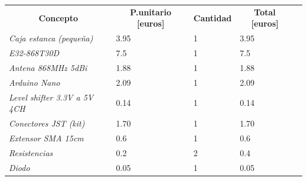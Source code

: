 \documentclass[12pt]{article}
\begin{document}
	\begin{table}[h!]
		\centering
		\begin{tabular}{l|l|l|l|l}
			\cline{1-4}
			\multicolumn{1}{|c|}{\textbf{Concepto}}                          & \multicolumn{1}{c|}{\textbf{P.unitario {[}euros{]}}} & \multicolumn{1}{c|}{\textbf{Cantidad}} & \multicolumn{1}{c|}{\textbf{Total {[}euros{]}}} &  \\ \cline{1-4}
			\multicolumn{1}{|l|}{\textit{Caja estanca (pequeña)}} & 3.95                                                 & 1                                      & 3.95                                            &  \\ \cline{1-4}
			\multicolumn{1}{|l|}{\textit{E32-868T30D}}                       & 7.5                                                  & 1                                      & 7.5                                             &  \\ \cline{1-4}
			\multicolumn{1}{|l|}{\textit{Antena 868MHz 5dBi}}                & 1.88                                                 & 1                                      & 1.88                                            &  \\ \cline{1-4}
			\multicolumn{1}{|l|}{\textit{Arduino Nano}}                      & 2.09                                                 & 1                                      & 2.09                                            &  \\ \cline{1-4}
			\multicolumn{1}{|l|}{\textit{Level shifter 3.3V a 5V 4CH}}       & 0.14                                                 & 1                                      & 0.14                                            &  \\ \cline{1-4}
			\multicolumn{1}{|l|}{\textit{Conectores JST (kit)}}              & 1.70                                                 & 1                                      & 1.70                                            &  \\ \cline{1-4}
			\multicolumn{1}{|l|}{\textit{Extensor SMA 15cm}}                 & 0.6                                                  & 1                                      & 0.6                                             &  \\ \cline{1-4}
			\multicolumn{1}{|l|}{\textit{Resistencias}}                      & 0.2                                                  & 2                                      & 0.4                                             &  \\ \cline{1-4}
			\multicolumn{1}{|l|}{\textit{Diodo}}                             & 0.05                                                 & 1                                      & 0.05                                            &  \\ \cline{1-4}

\end{tabular}
\end{table}
\end{document}
